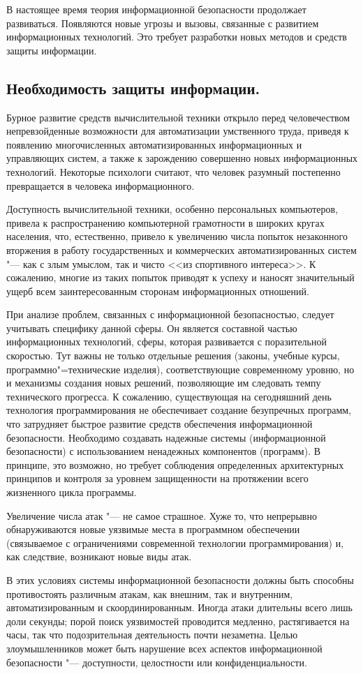 В настоящее время теория информационной безопасности продолжает развиваться. Появляются новые угрозы и вызовы, связанные с 
развитием информационных технологий. Это требует разработки новых методов и средств защиты информации\cite{urfu}.

\newpage
\subsection{Необходимость защиты информации.}
Бурное развитие средств вычислительной техники открыло перед человечеством непревзойденные возможности для автоматизации 
умственного труда, приведя к появлению многочисленных автоматизированных информационных и управляющих систем, а также к 
зарождению совершенно новых информационных технологий. Некоторые психологи считают, что человек разумный постепенно 
превращается в человека информационного.

Доступность вычислительной техники, особенно персональных компьютеров, привела к распространению компьютерной грамотности в 
широких кругах населения, что, естественно, привело к увеличению числа попыток незаконного вторжения в работу государственных 
и коммерческих автоматизированных систем "--- как с злым умыслом, так и чисто <<из спортивного интереса>>. К сожалению, многие из 
таких попыток приводят к успеху и наносят значительный ущерб всем заинтересованным сторонам информационных отношений.

При анализе проблем, связанных с информационной безопасностью, следует учитывать специфику данной сферы. Он 
является составной частью информационных технологий, сферы, которая развивается с поразительной скоростью. Тут важны не 
только отдельные решения (законы, учебные курсы, программно"=технические изделия), соответствующие современному уровню, но и 
механизмы создания новых решений, позволяющие им следовать темпу технического прогресса. К сожалению, существующая на 
сегодняшний день технология программирования не обеспечивает создание безупречных программ, что затрудняет быстрое развитие 
средств обеспечения информационной безопасности. Необходимо создавать надежные системы (информационной безопасности) с 
использованием ненадежных компонентов (программ). В принципе, это возможно, но требует соблюдения определенных архитектурных 
принципов и контроля за уровнем защищенности на протяжении всего жизненного цикла программы.

Увеличение числа атак "--- не самое страшное. Хуже то, что непрерывно обнаруживаются новые уязвимые места в программном 
обеспечении (связываемое с ограничениями современной технологии программирования) и, как следствие, возникают новые виды атак.

В этих условиях системы информационной безопасности должны быть способны противостоять различным атакам, как внешним, так и 
внутренним, автоматизированным и скоординированным. Иногда атаки длительны всего лишь доли секунды; порой поиск уязвимостей 
проводится медленно, растягивается на часы, так что подозрительная деятельность почти незаметна. Целью злоумышленников может 
быть нарушение всех аспектов информационной безопасности "---  доступности, целостности или конфиденциальности\cite{biblio}.

